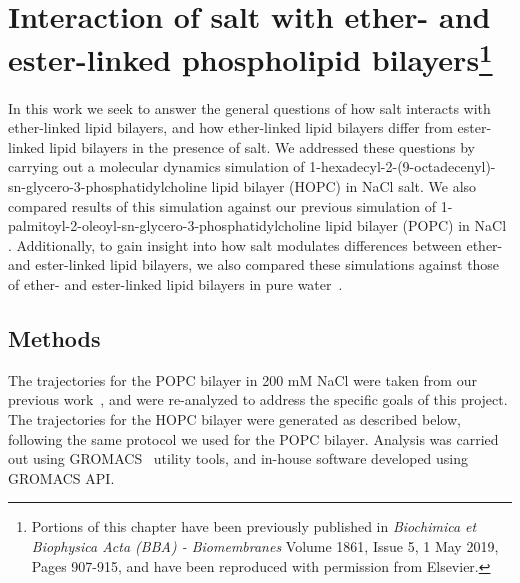 \documentclass[12pt,openany,final]{book}
\begin{document}
\chapter[Interaction of salt with ether- and ester-linked phospholipid bilayers]{Interaction of salt with ether- and ester-linked phospholipid bilayers\footnote{
    Portions of this chapter have been previously published in \emph{Biochimica et Biophysica Acta (BBA) - Biomembranes} Volume 1861, Issue 5, 1 May 2019, Pages 907-915,
    and have been reproduced with permission from Elsevier\cite{saunders:2019}.
}}
In this work we seek to answer the general questions of how salt inte\-racts 
with ether-linked lipid bilayers, and how ether-linked lipid bilayers differ from ester-linked lipid bilayers in the presence of salt.
We addressed these questions by carrying out a molecular dynamics simulation of 
1-hexadecyl-2-(9-octadecenyl)-sn-glycero-3-phosphatidylcholine lipid bilayer (HOPC) in NaCl salt. 
We also compared results of this simulation against our previous simulation of 
1-palmitoyl-2-oleoyl-sn-glycero-3-phosphatidylcholine lipid bilayer (POPC) 
in NaCl \cite{kruczek:2017}. Additionally, to gain insight into how salt modulates differences between ether- 
and ester-linked lipid bilayers, we also compared these simulations against those of ether- and ester-linked lipid bilayers in pure water~\cite{kruczek:2017:ether}. 
\section{Methods}
The trajectories for the POPC bilayer in 200 mM NaCl were taken from our previous work~\cite{kruczek:2017}, 
and were re-analyzed to address the specific goals of this project. The trajectories
for the HOPC bilayer were generated as described below, following the same protocol we used for the POPC bilayer. 
Analysis was carried out using GROMACS~\cite{abraham:2015,pall:2014,van:2005,lindahl:2001,berendsen:1995} utility 
tools, and in-house software developed using GROMACS API.
\end{document}
